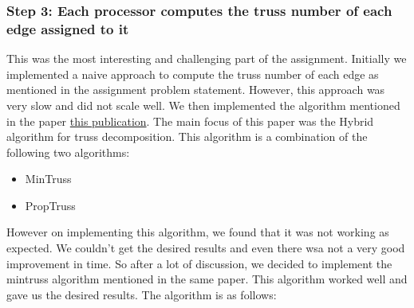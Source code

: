 \documentclass{article}
\begin{document}
\subsubsection{Step 3: Each processor computes the truss number of each edge assigned to it}

This was the most interesting and challenging part of the assignment. Initially we implemented a naive approach to compute the truss number of each edge as mentioned in the assignment problem statement. However, this approach was very slow and did not scale well. We then implemented the algorithm mentioned in the paper \href{https://link.springer.com/chapter/10.1007/978-3-319-96983-1_50}{this publication}. The main focus of this paper was the Hybrid algorithm for truss decomposition. This algorithm is a combination of the following two algorithms:
\begin{itemize}
    \item MinTruss
    \item PropTruss
\end{itemize}

However on implementing this algorithm, we found that it was not working as expected. We couldn't get the desired results and even there wsa not a very good improvement in time. So after a lot of discussion, we decided to implement the mintruss algorithm mentioned in the same paper. This algorithm worked well and gave us the desired results. The algorithm is as follows:

\end{document}

